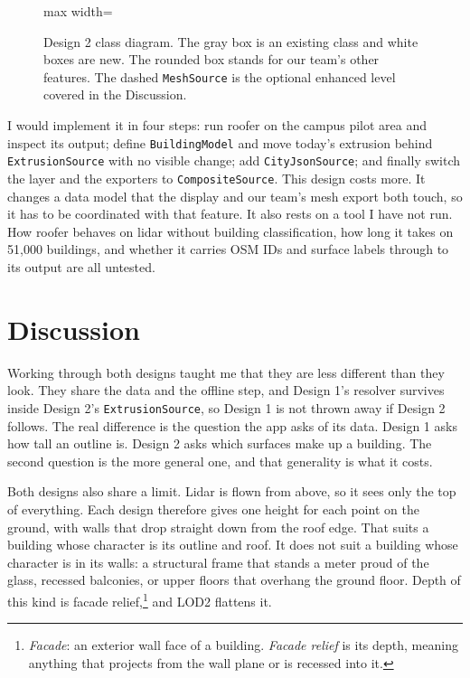 \documentclass[11pt,letterpaper]{article}
\begin{document}
\begin{figure}[!htbp]
\begin{adjustbox}{max width=\textwidth}
  \end{adjustbox}
  \caption{Design 2 class diagram. The gray box is an existing class and white boxes are new. The rounded box stands for our team's other features. The dashed \texttt{MeshSource} is the optional enhanced level covered in the Discussion.}
  \label{fig:design2}
\end{figure}

I would implement it in four steps: run roofer on the campus pilot area and inspect its output; define \texttt{BuildingModel} and move today's extrusion behind \texttt{ExtrusionSource} with no visible change; add \texttt{CityJsonSource}; and finally switch the layer and the exporters to \texttt{CompositeSource}. This design costs more. It changes a data model that the display and our team's mesh export both touch, so it has to be coordinated with that feature. It also rests on a tool I have not run. How roofer behaves on lidar without building classification, how long it takes on 51,000 buildings, and whether it carries OSM IDs and surface labels through to its output are all untested.

\section*{Discussion}

Working through both designs taught me that they are less different than they look. They share the data and the offline step, and Design 1's resolver survives inside Design 2's \texttt{ExtrusionSource}, so Design 1 is not thrown away if Design 2 follows. The real difference is the question the app asks of its data. Design 1 asks how tall an outline is. Design 2 asks which surfaces make up a building. The second question is the more general one, and that generality is what it costs.

Both designs also share a limit. Lidar is flown from above, so it sees only the top of everything. Each design therefore gives one height for each point on the ground, with walls that drop straight down from the roof edge. That suits a building whose character is its outline and roof. It does not suit a building whose character is in its walls: a structural frame that stands a meter proud of the glass, recessed balconies, or upper floors that overhang the ground floor. Depth of this kind is facade relief,\footnote{\emph{Facade}: an exterior wall face of a building. \emph{Facade relief} is its depth, meaning anything that projects from the wall plane or is recessed into it.} and LOD2 flattens it.
\end{document}

